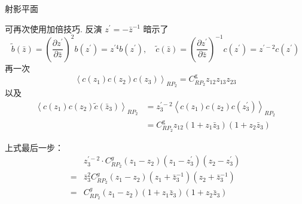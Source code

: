 \centerline{\Large 射影平面}
可再次使用加倍技巧. 反演 $z^{\prime}=-\bar{z}^{-1}$ 暗示了
\begin{equation}
	\tilde{b}(\bar{z})=\left(\frac{\partial z^{\prime}}{\partial \bar{z}}\right)^{2} b\left(z^{\prime}\right)=z^{\prime 4} b\left(z^{\prime}\right), \quad \tilde{c}(\bar{z})=\left(\frac{\partial z^{\prime}}{\partial \bar{z}}\right)^{-1} c\left(z^{\prime}\right)=z^{\prime-2} c\left(z^{\prime}\right)
\end{equation}
再一次
\begin{equation}
	\left\langle c\left(z_{1}\right) c\left(z_{2}\right) c\left(z_{3}\right)\right\rangle_{R P_{2}}=C_{R P_{2}}^{\mathrm{g}} z_{12} z_{13} z_{23}
\end{equation}
以及
\begin{equation}
	\begin{aligned}
		\left\langle c\left(z_{1}\right) c\left(z_{2}\right) \tilde{c}\left(\bar{z}_{3}\right)\right\rangle_{R P_{2}} &=z_{3}^{\prime-2}\left\langle c\left(z_{1}\right) c\left(z_{2}\right) c\left(z_{3}^{\prime}\right)\right\rangle_{R P_{2}} \\
		&=C_{R P_{2}}^{\mathrm{g}} z_{12}\left(1+z_{1} \bar{z}_{3}\right)\left(1+z_{2} \bar{z}_{3}\right)
	\end{aligned}
\end{equation}
\begin{remark}
上式最后一步：
$$
\begin{aligned}
& z_{3}^{\prime-2} \cdot C_{R P_{2}}^{g}\left(z_{1}-z_{2}\right)\left(z_{1}-z_{3}^{\prime}\right)\left(z_{2}-z_{3}^{\prime}\right) \\
=& \bar{z}_{3}^{2} C_{R P_{2}}^{g}\left(z_{1}-z_{2}\right)\left(z_{1}+\bar{z}_{3}^{-1}\right)\left(z_{2}+\bar{z}_{3}^{-1}\right) \\
=& C_{R P_{2}}^{g}\left(z_{1}-z_{2}\right)\left(1+z_{1} \bar{z}_{3}\right)\left(1+z_{2} \bar{z}_{3}\right)
\end{aligned}
$$
\end{remark}

